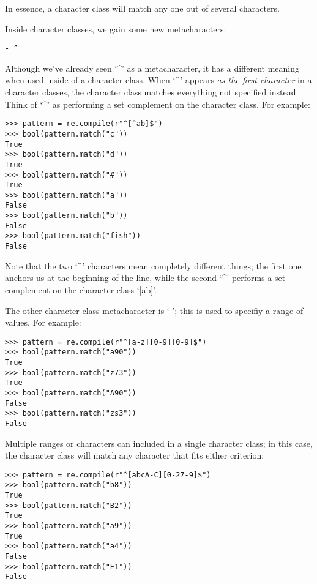 In essence, a character class will match any one out of several characters.  

Inside character classes, we gain some new metacharacters:
\begin{lstlisting}
- ^ 
\end{lstlisting}

Although we've already seen `^' as a metacharacter, it has a different meaning when used inside of a character class.
When `^' appears \emph{as the first character} in a character classes, the character class matches everything not specified instead.
Think of `^' as performing a set complement on the character class.
For example:
\begin{lstlisting}
>>> pattern = re.compile(r"^[^ab]$")
>>> bool(pattern.match("c"))
True
>>> bool(pattern.match("d"))
True
>>> bool(pattern.match("#"))
True
>>> bool(pattern.match("a"))
False
>>> bool(pattern.match("b"))
False
>>> bool(pattern.match("fish"))
False
\end{lstlisting}

Note that the two `^' characters mean completely different things; the first one anchors us at the beginning of the line, while the second `^' performs a set complement on the character class `[ab]'.

The other character class metacharacter is `-'; this is used to specifiy a range of values.
For example:
\begin{lstlisting}
>>> pattern = re.compile(r"^[a-z][0-9][0-9]$")
>>> bool(pattern.match("a90"))
True
>>> bool(pattern.match("z73"))
True
>>> bool(pattern.match("A90"))
False
>>> bool(pattern.match("zs3"))
False
\end{lstlisting}

Multiple ranges or characters can included in a single character class; in this case, the character class will match any character that fits either criterion:
\begin{lstlisting}
>>> pattern = re.compile(r"^[abcA-C][0-27-9]$")
>>> bool(pattern.match("b8"))
True
>>> bool(pattern.match("B2"))
True
>>> bool(pattern.match("a9"))
True
>>> bool(pattern.match("a4"))
False
>>> bool(pattern.match("E1"))
False
\end{lstlisting}

